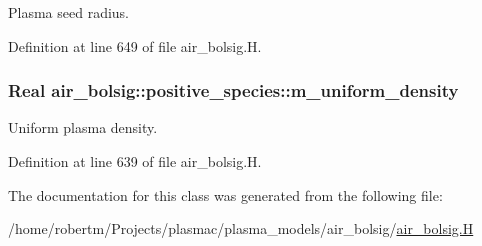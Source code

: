 Plasma seed radius. 



Definition at line 649 of file air\+\_\+bolsig.\+H.

\subsubsection[{\texorpdfstring{m\+\_\+uniform\+\_\+density}{m_uniform_density}}]{\setlength{\rightskip}{0pt plus 5cm}Real air\+\_\+bolsig\+::positive\+\_\+species\+::m\+\_\+uniform\+\_\+density}\hypertarget{classair__bolsig_1_1positive__species_ac629c5e024d652fc0e278ca9a6cc511f}{}\label{classair__bolsig_1_1positive__species_ac629c5e024d652fc0e278ca9a6cc511f}


Uniform plasma density. 



Definition at line 639 of file air\+\_\+bolsig.\+H.



The documentation for this class was generated from the following file\+:\begin{DoxyCompactItemize}
\item 
/home/robertm/\+Projects/plasmac/plasma\+\_\+models/air\+\_\+bolsig/\hyperlink{air__bolsig_8H}{air\+\_\+bolsig.\+H}\end{DoxyCompactItemize}
